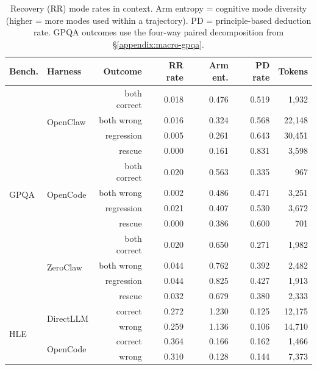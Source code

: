 \begin{table}[t]
\centering
\small
\caption{%
  Recovery (RR) mode rates in context.
  Arm entropy = cognitive mode diversity (higher = more modes used within a
  trajectory).
  PD = principle-based deduction rate.
  GPQA outcomes use the four-way paired decomposition from
  \S\ref{appendix:macro-gpqa}.
}
\label{tab:cross-rr}
\setlength{\tabcolsep}{3pt}
\begin{tabular}{llrrrrr}
\toprule
Bench. & Harness & Outcome & RR rate & Arm ent. & PD rate & Tokens \\
\midrule
\multirow{12}{*}{GPQA}
& \multirow{4}{*}{OpenClaw}
  & both correct & 0.018 & 0.476 & 0.519 &  1{,}932 \\
& & both wrong   & 0.016 & 0.324 & 0.568 & 22{,}148 \\
& & regression   & 0.005 & 0.261 & 0.643 & 30{,}451 \\
& & rescue       & 0.000 & 0.161 & 0.831 &  3{,}598 \\
\cmidrule{2-7}
& \multirow{4}{*}{OpenCode}
  & both correct & 0.020 & 0.563 & 0.335 &    967 \\
& & both wrong   & 0.002 & 0.486 & 0.471 &  3{,}251 \\
& & regression   & 0.021 & 0.407 & 0.530 &  3{,}672 \\
& & rescue       & 0.000 & 0.386 & 0.600 &    701 \\
\cmidrule{2-7}
& \multirow{4}{*}{ZeroClaw}
  & both correct & 0.020 & 0.650 & 0.271 &  1{,}982 \\
& & both wrong   & 0.044 & 0.762 & 0.392 &  2{,}482 \\
& & regression   & 0.044 & 0.825 & 0.427 &  1{,}913 \\
& & rescue       & 0.032 & 0.679 & 0.380 &  2{,}333 \\
\midrule
\multirow{4}{*}{HLE}
& \multirow{2}{*}{DirectLLM}
  & correct & 0.272 & 1.230 & 0.125 & 12{,}175 \\
& & wrong   & 0.259 & 1.136 & 0.106 & 14{,}710 \\
\cmidrule{2-7}
& \multirow{2}{*}{OpenCode}
  & correct & 0.364 & 0.166 & 0.162 &  1{,}466 \\
& & wrong   & 0.310 & 0.128 & 0.144 &  7{,}373 \\
\bottomrule
\end{tabular}
\end{table}


